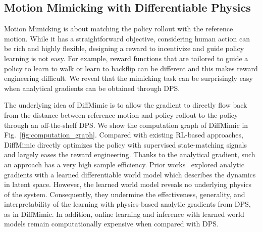 \subsection{Motion Mimicking with Differentiable Physics}

Motion Mimicking is about matching the policy rollout with the reference motion. While it has a straightforward objective, considering human action can be rich and highly flexible, designing a reward to incentivize and guide policy learning is not easy. For example, reward functions that are tailored to guide a policy to learn to walk or learn to backflip can be different and this makes reward engineering difficult. We reveal that the mimicking task can be surprisingly easy when analytical gradients can be obtained through DPS. 

The underlying idea of DiffMimic is to allow the gradient to directly flow back from the distance between reference motion and policy rollout to the policy through an off-the-shelf DPS. We show the computation graph of DiffMimic in Fig.~\ref{fig:computation_graph}. 
Compared with existing RL-based approaches, DiffMimic directly optimizes the policy with supervised state-matching signals and largely eases the reward engineering.
Thanks to the analytical gradient, such an approach has a very high sample efficiency. 
Prior works~\citep{fussell2021supertrack} explored analytic gradients with a learned differentiable world model which describes the dynamics in latent space. However, the learned world model reveals no underlying physics of the system. Consequently, they undermine the effectiveness, generality, and interpretability of the learning with physics-based analytic gradients from DPS, as in DiffMimic. In addition, online learning and inference with learned world models remain computationally expensive when compared with DPS.

